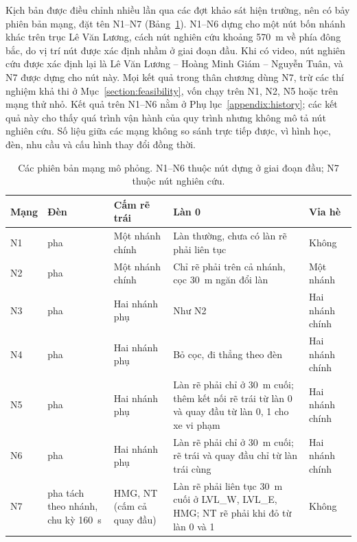 \documentclass[../main.tex]{subfiles}
\begin{document}
Kịch bản được điều chỉnh nhiều lần qua các đợt khảo sát hiện trường, nên có bảy phiên bản mạng, đặt tên N1--N7 (Bảng~\ref{table:4.nets}). N1--N6 dựng cho một nút bốn nhánh khác trên trục Lê Văn Lương, cách nút nghiên cứu khoảng 570~m về phía đông bắc, do vị trí nút được xác định nhầm ở giai đoạn đầu. Khi có video, nút nghiên cứu được xác định lại là Lê Văn Lương -- Hoàng Minh Giám -- Nguyễn Tuân, và N7 được dựng cho nút này. Mọi kết quả trong thân chương dùng N7, trừ các thí nghiệm khả thi ở Mục~\ref{section:feasibility}, vốn chạy trên N1, N2, N5 hoặc trên mạng thử nhỏ. Kết quả trên N1--N6 nằm ở Phụ lục~\ref{appendix:history}; các kết quả này cho thấy quá trình vận hành của quy trình nhưng không mô tả nút nghiên cứu. Số liệu giữa các mạng không so sánh trực tiếp được, vì hình học, đèn, nhu cầu và cấu hình thay đổi đồng thời.

\begin{table}[!htbp]
\centering
\small\setlength{\tabcolsep}{3pt}
\caption{Các phiên bản mạng mô phỏng. N1--N6 thuộc nút dựng ở giai đoạn đầu; N7 thuộc nút nghiên cứu.} \label{table:4.nets}
\begin{tabular}{|p{1.1cm}|>{\raggedright\arraybackslash}p{1.6cm}|>{\raggedright\arraybackslash}p{2.4cm}|>{\raggedright\arraybackslash}p{4.5cm}|>{\raggedright\arraybackslash}p{2.2cm}|}
\hline
\textbf{Mạng} & \textbf{Đèn} & \textbf{Cấm rẽ trái} & \textbf{Làn 0} & \textbf{Vỉa hè} \\ \hline
N1 & 2 pha & Một nhánh chính & Làn thường, chưa có làn rẽ phải liên tục & Không \\ \hline
N2 & 2 pha & Một nhánh chính & Chỉ rẽ phải trên cả nhánh, cọc 30~m ngăn đổi làn & Một nhánh \\ \hline
N3 & 3 pha & Hai nhánh phụ & Như N2 & Hai nhánh chính \\ \hline
N4 & 3 pha & Hai nhánh phụ & Bỏ cọc, đi thẳng theo đèn & Hai nhánh chính \\ \hline
N5 & 3 pha & Hai nhánh phụ & Làn rẽ phải chỉ ở 30~m cuối; thêm kết nối rẽ trái từ làn 0 và quay đầu từ làn 0, 1 cho xe vi phạm & Hai nhánh chính \\ \hline
N6 & 3 pha & Hai nhánh phụ & Làn rẽ phải chỉ ở 30~m cuối; rẽ trái và quay đầu chỉ từ làn trái cùng & Hai nhánh chính \\ \hline
N7 & 3 pha tách theo nhánh, chu kỳ 160~s & HMG, NT (cấm cả quay đầu) & Làn rẽ phải liên tục 30~m cuối ở LVL\_W, LVL\_E, HMG; NT rẽ phải khi đỏ từ làn 0 và 1 & Không \\ \hline
\end{tabular}
\end{table}
\end{document}
